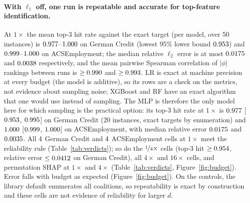 \paragraph{With $\ell_1$ off, one run is repeatable and accurate for top-feature identification.} At $1\times$ the mean top-3 hit rate against the exact target (per model, over 50 instances) is $0.977$--$1.000$ on German Credit (lowest 95\% lower bound $0.953$) and $0.999$--$1.000$ on ACSEmployment; the median relative $\ell_2$ error is at most $0.0175$ and $0.0038$ respectively, and the mean pairwise Spearman correlation of $|\phi|$ rankings between runs is $\ge0.990$ and $\ge0.993$. LR is exact at machine precision at every budget (the model is additive), so its rows are a check on the metrics, not evidence about sampling noise; XGBoost and RF have an exact algorithm that one would use instead of sampling. The MLP is therefore the only model here for which sampling is the practical option: its top-3 hit rate at $1\times$ is $0.977$ [$0.953$, $0.995$] on German Credit (20 instances, exact targets by enumeration) and $1.000$ [$0.999$, $1.000$] on ACSEmployment, with median relative error $0.0175$ and $0.0035$. All $4$ German Credit and $4$ ACSEmployment cells at $1\times$ meet the reliability rule (Table~\ref{tab:verdicts}); so do the $\nicefrac14\times$ cells (top-3 hit $\ge0.954$, relative error $\le0.0412$ on German Credit), all $4\times$ and $16\times$ cells, and permutation SHAP at $1\times$ and $4\times$ (Table~\ref{tab:verdicts}, Figure~\ref{fig:budget}). Error falls with budget as expected (Figure~\ref{fig:budget}). On the controls, the library default enumerates all coalitions, so repeatability is exact by construction and these cells are not evidence of reliability for larger $d$.

